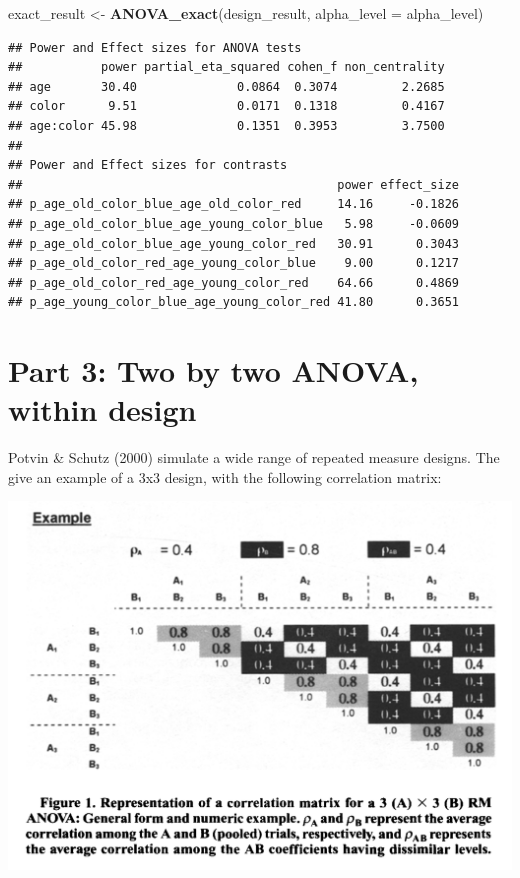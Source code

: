 \documentclass[]{book}
\newenvironment{Shaded}{\begin{snugshade}}{\end{snugshade}}
\newcommand{\DataTypeTok}[1]{\textcolor[rgb]{0.13,0.29,0.53}{#1}}
\newcommand{\KeywordTok}[1]{\textcolor[rgb]{0.13,0.29,0.53}{\textbf{#1}}}
\newcommand{\NormalTok}[1]{#1}
\newcommand{\StringTok}[1]{\textcolor[rgb]{0.31,0.60,0.02}{#1}}
\begin{document}
\begin{Shaded}
\begin{Highlighting}[]
\NormalTok{exact_result <-}\StringTok{ }\KeywordTok{ANOVA_exact}\NormalTok{(design_result, }\DataTypeTok{alpha_level =}\NormalTok{ alpha_level)}
\end{Highlighting}
\end{Shaded}

\begin{verbatim}
## Power and Effect sizes for ANOVA tests
##           power partial_eta_squared cohen_f non_centrality
## age       30.40              0.0864  0.3074         2.2685
## color      9.51              0.0171  0.1318         0.4167
## age:color 45.98              0.1351  0.3953         3.7500
## 
## Power and Effect sizes for contrasts
##                                            power effect_size
## p_age_old_color_blue_age_old_color_red     14.16     -0.1826
## p_age_old_color_blue_age_young_color_blue   5.98     -0.0609
## p_age_old_color_blue_age_young_color_red   30.91      0.3043
## p_age_old_color_red_age_young_color_blue    9.00      0.1217
## p_age_old_color_red_age_young_color_red    64.66      0.4869
## p_age_young_color_blue_age_young_color_red 41.80      0.3651
\end{verbatim}

\hypertarget{part-3-two-by-two-anova-within-design}{%
\section{Part 3: Two by two ANOVA, within design}\label{part-3-two-by-two-anova-within-design}}

Potvin \& Schutz (2000) simulate a wide range of repeated measure designs. The give an example of a 3x3 design, with the following correlation matrix:

\includegraphics{screenshots/PS2000.png}
\end{document}
